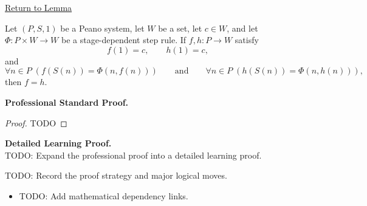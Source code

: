 \newpage
{}
\label{prf:uniqueness-of-general-recursive-functions}

\begin{remark*}[Return]
\hyperref[lem:uniqueness-of-general-recursive-functions]{Return to Lemma}
\end{remark*}

\begin{theorem*}
Let $(P,S,1)$ be a Peano system, let $W$ be a set, let $c\in W$, and let
$\Phi:P\times W\to W$ be a stage-dependent step rule. If $f,h:P\to W$ satisfy
\[
f(1)=c,\qquad h(1)=c,
\]
and
\[
\forall n\in P\;(f(S(n))=\Phi(n,f(n)))
\qquad\text{and}\qquad
\forall n\in P\;(h(S(n))=\Phi(n,h(n))),
\]
then $f=h$.
\end{theorem*}

\textbf{Professional Standard Proof.}~\\
\begin{proof}
TODO
\end{proof}

\textbf{Detailed Learning Proof.}~\\
TODO: Expand the professional proof into a detailed learning proof.

\begin{remark*}
TODO: Record the proof strategy and major logical moves.
\end{remark*}

\begin{dependencies}
\begin{itemize}
  \item TODO: Add mathematical dependency links.
\end{itemize}
\end{dependencies}
